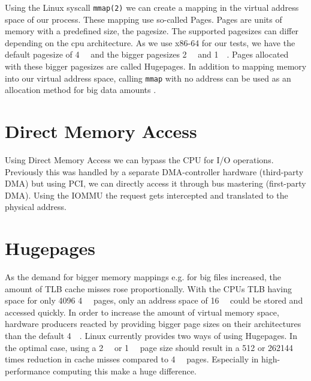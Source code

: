 Using the Linux syscall \texttt{mmap(2)} we can create a mapping in the virtual address space of our process. These mapping use so-called Pages. Pages are units of memory with a predefined size, the pagesize. The supported pagesizes can differ depending on the cpu architecture. As we use x86-64 for our tests, we have the default pagesize of \qty{4}{\kibi\byte} and the bigger pagesizes \qty{2}{\mebi\byte} and \qty{1}{\gibi\byte}. Pages allocated with these bigger pagesizes are called Hugepages. In addition to mapping memory into our virtual address space, calling \texttt{mmap} with no address can be used as an allocation method for big data amounts \cite{mmapmanpage}.

\section{Direct Memory Access}
Using Direct Memory Access we can bypass the CPU for I/O operations. Previously this was handled by a separate DMA-controller hardware (third-party DMA) but using PCI, we can directly access it through bus mastering (first-party DMA). Using the IOMMU the request gets intercepted and translated to the physical address.

\section{Hugepages}
As the demand for bigger memory mappings e.g. for big files increased, the amount of TLB cache misses rose proportionally. With the CPUs TLB having space for only 4096 \qty{4}{\kibi\byte} pages, only an address space of \qty{16}{\mebi\byte} could be stored and accessed quickly. In order to increase the amount of virtual memory space, hardware producers reacted by providing bigger page sizes on their architectures than the default \qty{4}{\kibi\byte}.
Linux currently provides two ways of using Hugepages.
In the optimal case, using a \qty{2}{\mebi\byte} or \qty{1}{\gibi\byte} page size should result in a 512 or 262144 times reduction in cache misses compared to \qty{4}{\kibi\byte} pages. Especially in high-performance computing this make a huge difference.

